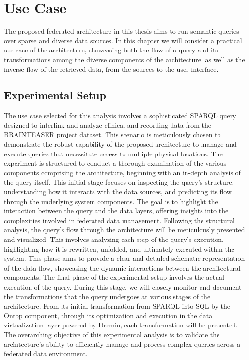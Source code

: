 
\chapter{Use Case}
\label{chp:usecase}

The proposed federated architecture in this thesis aims to run semantic queries over sparse and diverse data sources. In this chapter we will consider a practical use case of the architecture, showcasing both the flow of a query and its transformations among the diverse components of the architecture, as well as the inverse flow of the retrieved data, from the sources to the user interface.

\section{Experimental Setup}
The use case selected for this analysis involves a sophisticated \ac{SPARQL} query designed to interlink and analyze clinical and recording data from the \ac{BRAINTEASER} project dataset. This scenario is meticulously chosen to demonstrate the robust capability of the proposed architecture to manage and execute queries that necessitate access to multiple physical locations.
The experiment is structured to conduct a thorough examination of the various components comprising the architecture, beginning with an in-depth analysis of the query itself. This initial stage focuses on inspecting the query's structure, understanding how it interacts with the data sources, and predicting its flow through the underlying system components. The goal is to highlight the interaction between the query and the data layers, offering insights into the complexities involved in federated data management.
Following the structural analysis, the query's flow through the architecture will be meticulously presented and visualized. This involves analyzing each step of the query's execution, highlighting how it is rewritten, unfolded, and ultimately executed within the system. This phase aims to provide a clear and detailed schematic representation of the data flow, showcasing the dynamic interactions between the architectural components.
The final phase of the experimental setup involves the actual execution of the query. During this stage, we will closely monitor and document the transformations that the query undergoes at various stages of the architecture. From its initial transformation from \ac{SPARQL} into \ac{SQL} by the Ontop component, through its optimization and execution in the data virtualization layer powered by Dremio, each transformation will be presented.
The overarching objective of this experimental analysis is to validate the architecture's ability to efficiently manage and process complex queries across a federated data environment.

